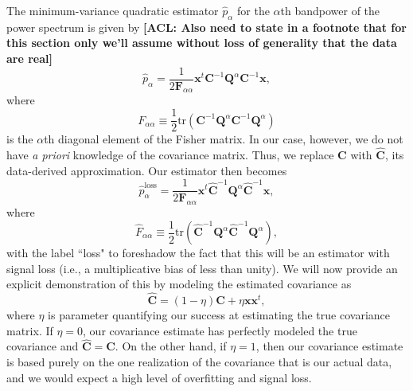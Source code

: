\documentclass[preprint2,numberedappendix,tighten]{aastex6}  %
\newcommand{\x}{\mathbf{x}}
\newcommand{\C}{\mathbf{C}}
\newcommand{\Chat}{\mathbf{\hat{C}}}
\newcommand{\F}{\mathbf{F}}
\newcommand{\Q}{\mathbf{Q}}
\newcommand{\acl}[1]{{\color{red} \textbf{[ACL:  #1]}}}
\begin{document}
The minimum-variance quadratic estimator $\hat{p}_\alpha$ for the $\alpha$th bandpower of the power spectrum is given by \acl{Also need to state in a footnote that for this section only we'll assume without loss of generality that the data are real}
\begin{equation}
\hat{p}_\alpha = \frac{1} {2 \F_{\alpha \alpha} }\x^t \C^{-1} \Q^{\alpha} \C^{-1} \x,
\end{equation}
where
\begin{equation}
F_{\alpha \alpha} \equiv \frac{1}{2} \textrm{tr} \left( \C^{-1} \Q^\alpha \C^{-1} \Q^\alpha \right)
\end{equation}
is the $\alpha$th diagonal element of the Fisher matrix. In our case, however, we do not have \emph{a priori} knowledge of the covariance matrix. Thus, we replace $\C$ with $\Chat$, its data-derived approximation. Our estimator then becomes
\begin{equation}
\label{eq:phatloss}
\hat{p}_\alpha^\textrm{loss} = \frac{1} {2 \F_{\alpha \alpha} }\x^t \Chat^{-1} \Q^{\alpha} \Chat^{-1} \x,
\end{equation}
where
\begin{equation}
\hat{F}_{\alpha \alpha} \equiv \frac{1}{2} \textrm{tr} \left( \Chat^{-1} \Q^\alpha \Chat^{-1} \Q^\alpha \right),
\end{equation}
with the label ``loss" to foreshadow the fact that this will be an estimator with signal loss (i.e., a multiplicative bias of less than unity). We will now provide an explicit demonstration of this by modeling the estimated covariance as
\begin{equation}
\label{eq:ChatDef}
\Chat = (1-\eta) \C + \eta \x \x^t,
\end{equation}
where $\eta$ is parameter quantifying our success at estimating the true covariance matrix. If $\eta = 0$, our covariance estimate has perfectly modeled the true covariance and $\Chat = \C$. On the other hand, if $\eta =1$, then our covariance estimate is based purely on the one realization of the covariance that is our actual data, and we would expect a high level of overfitting and signal loss.
\end{document}
